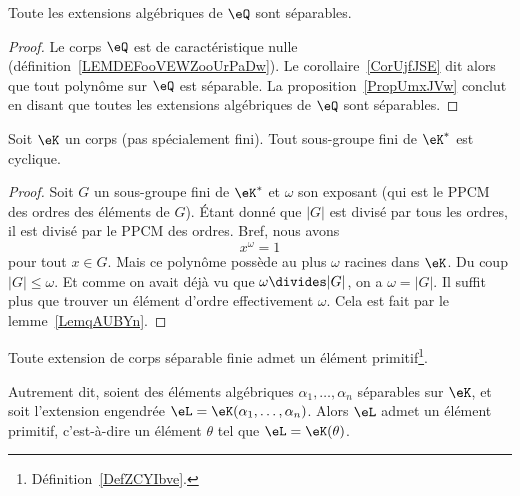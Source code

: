 \begin{corollary}  \label{CORooNZZMooIoBYXY}
    Toute les extensions algébriques de \( \eQ\) sont séparables.
\end{corollary}

\begin{proof}
    Le corps \( \eQ\) est de caractéristique nulle (définition~\ref{LEMDEFooVEWZooUrPaDw}). Le corollaire~\ref{CorUjfJSE} dit alors que tout polynôme sur \( \eQ\) est séparable. La proposition~\ref{PropUmxJVw} conclut en disant que toutes les extensions algébriques de \( \eQ\) sont séparables.
\end{proof}

\begin{theorem}      \label{ThobkwCMm}
    Soit \( \eK\) un corps (pas spécialement fini). Tout sous-groupe fini de \( \eK^*\) est cyclique.
\end{theorem}

\begin{proof}
    Soit \( G\) un sous-groupe fini de \( \eK^*\) et \( \omega\) son exposant (qui est le PPCM des ordres des éléments de \( G\)). Étant donné que \( | G |\) est divisé par tous les ordres, il est divisé par le PPCM des ordres. Bref, nous avons
    \begin{equation}
        x^{\omega}=1
    \end{equation}
    pour tout \( x\in G\). Mais ce polynôme possède au plus \( \omega\) racines dans \( \eK\). Du coup \( | G |\leq \omega\). Et comme on avait déjà vu que \( \omega\divides | G |\), on a \( \omega=| G |\). Il suffit plus que trouver un élément d'ordre effectivement \( \omega\). Cela est fait par le lemme~\ref{LemqAUBYn}.
\end{proof}

\begin{theorem}   \label{ThoORxgBC}
    Toute extension de corps séparable finie admet un élément primitif\footnote{Définition~\ref{DefZCYIbve}.}.

    Autrement dit, soient des éléments algébriques \( \alpha_1,\ldots, \alpha_n\) séparables sur \( \eK\), et soit l'extension engendrée \( \eL=\eK(\alpha_1,\ldots, \alpha_n)\). Alors \( \eL \) admet un élément primitif, c'est-à-dire un élément \( \theta \) tel que \( \eL = \eK(\theta)\).
\end{theorem}

